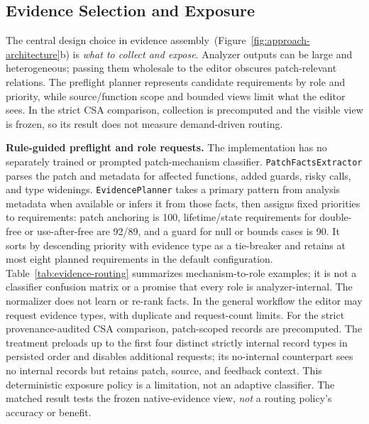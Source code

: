 \subsection{Evidence Selection and Exposure}
\label{sec:adaptive-selection}

The central design choice in evidence assembly~(Figure~\ref{fig:approach-architecture}b) is \emph{what to collect and expose}.  Analyzer outputs can be large and heterogeneous; passing them wholesale to the editor obscures patch-relevant relations.  The preflight planner represents candidate requirements by role and priority, while source/function scope and bounded views limit what the editor sees.  In the strict CSA comparison, collection is precomputed and the visible view is frozen, so its result does not measure demand-driven routing.

\textbf{Rule-guided preflight and role requests.}
The implementation has no separately trained or prompted patch-mechanism classifier.  \texttt{PatchFacts\allowbreak Extractor} parses the patch and metadata for affected functions, added guards, risky calls, and type widenings.  \texttt{Evidence\allowbreak Planner} takes a primary pattern from analysis metadata when available or infers it from those facts, then assigns fixed priorities to requirements: patch anchoring is 100, lifetime/state requirements for double-free or use-after-free are 92/89, and a guard for null or bounds cases is 90.  It sorts by descending priority with evidence type as a tie-breaker and retains at most eight planned requirements in the default configuration.  Table~\ref{tab:evidence-routing} summarizes mechanism-to-role examples; it is not a classifier confusion matrix or a promise that every role is analyzer-internal.  The normalizer does not learn or re-rank facts.  In the general workflow the editor may request evidence types, with duplicate and request-count limits.
For the strict provenance-audited CSA comparison, patch-scoped records are precomputed.  The treatment preloads up to the first four distinct strictly internal record types in persisted order and disables additional requests; its no-internal counterpart sees no internal records but retains patch, source, and feedback context.  This deterministic exposure policy is a limitation, not an adaptive classifier.  The matched result tests the frozen native-evidence view, \emph{not} a routing policy's accuracy or benefit.

